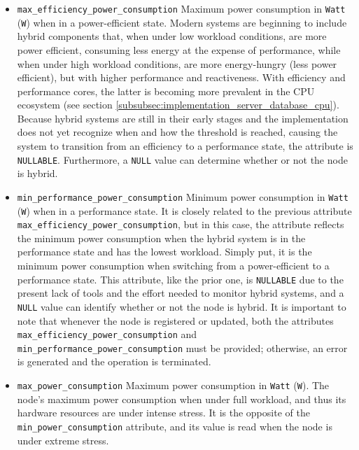 \begin{itemize}
  \item \texttt{max\_efficiency\_power\_consumption}
    \newline
    Maximum power consumption in \texttt{Watt} (\texttt{W}) when in a power-efficient
    state.
    \newline
    Modern systems are beginning to include hybrid components that, when under
    low workload conditions, are more power efficient, consuming less energy at
    the expense of performance, while when under high workload conditions, are
    more energy-hungry (less power efficient), but with higher performance and reactiveness.
    With efficiency and performance cores, the latter is becoming more prevalent
    in the CPU ecosystem (see section
    \ref{subsubsec:implementation_server_database_cpu}).
    \newline
    Because hybrid systems are still in their early stages and the
    implementation does not yet recognize when and how the threshold is reached,
    causing the system to transition from an efficiency to a performance state,
    the attribute is \texttt{NULLABLE}. Furthermore, a \texttt{NULL} value can
    determine whether or not the node is hybrid.

  \item \texttt{min\_performance\_power\_consumption}
    \newline
    Minimum power consumption in \texttt{Watt} (\texttt{W}) when in a
    performance state.
    \newline
    It is closely related to the previous attribute \texttt{max\_efficiency\_power\_consumption},
    but in this case, the attribute reflects the minimum power consumption when
    the hybrid system is in the performance state and has the lowest workload. Simply
    put, it is the minimum power consumption when switching from a power-efficient
    to a performance state.
    \newline
    This attribute, like the prior one, is \texttt{NULLABLE} due to the present
    lack of tools and the effort needed to monitor hybrid systems, and a \texttt{NULL}
    value can identify whether or not the node is hybrid.
    \newline
    It is important to note that whenever the node is registered or updated,
    both the attributes \texttt{max\_efficiency\_power\_consumption} and \texttt{min\_performance\_power\_consumption}
    must be provided; otherwise, an error is generated and the operation is
    terminated.

  \item \texttt{max\_power\_consumption}
    \newline
    Maximum power consumption in \texttt{Watt} (\texttt{W}).
    \newline
    The node's maximum power consumption when under full workload, and thus its
    hardware resources are under intense stress.
    \newline
    It is the opposite of the \texttt{min\_power\_consumption} attribute, and its
    value is read when the node is under extreme stress.


\end{itemize}
